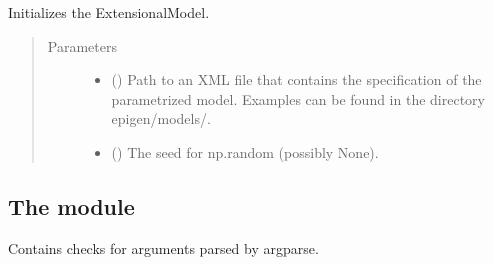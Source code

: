 \documentclass[a4paper,10pt,english]{sphinxhowto}
\begin{document}
\begin{fulllineitems}
\begin{fulllineitems}
\begin{quote}
\begin{description}
\end{description}\end{quote}

\end{fulllineitems}


\begin{fulllineitems}
\label{\detokenize{utils:utils.parametrized_model.ParametrizedModel.__init__}}
Initializes the ExtensionalModel.
\begin{quote}\begin{description}
\item[{Parameters}] \leavevmode\begin{itemize}
\item {} 
 () \textendash{} Path to an XML file that contains the specification of the parametrized model.
Examples can be found in the directory epigen/models/.

\item {} 
 () \textendash{} The seed for np.random (possibly None).

\end{itemize}

\end{description}\end{quote}

\end{fulllineitems}


\end{fulllineitems}



\subsection{The module }
\label{\detokenize{utils:module-utils.argparse_checks}}\label{\detokenize{utils:the-module-utils-argparse-checks-py}}
Contains checks for arguments parsed by argparse.
\end{document}
